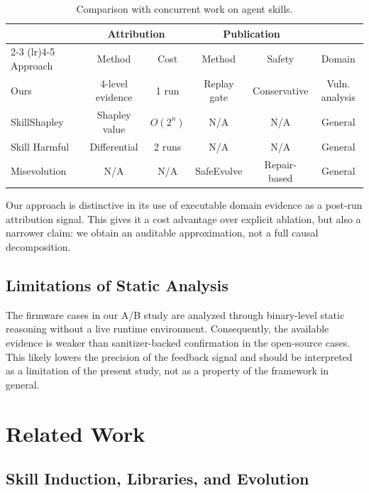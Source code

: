 ﻿\documentclass[preprint,12pt]{elsarticle}
\begin{document}
\begin{table}[t]
\centering
\caption{Comparison with concurrent work on agent skills.}
\label{tab:comparison}
\footnotesize
\begin{tabular}{l c c c c c}
\toprule
& \multicolumn{2}{c}{Attribution} & \multicolumn{2}{c}{Publication} & \\
\cmidrule(lr){2-3} \cmidrule(lr){4-5}
Approach & Method & Cost & Method & Safety & Domain \\
\midrule
Ours & 4-level evidence & 1 run & Replay gate & Conservative & Vuln. analysis \\
SkillShapley~\cite{skillshapley} & Shapley value & $O(2^n)$ & N/A & N/A & General \\
Skill Harmful~\cite{skillharmful} & Differential & 2 runs & N/A & N/A & General \\
Misevolution~\cite{misevolution} & N/A & N/A & SafeEvolve & Repair-based & General \\
\bottomrule
\end{tabular}
\end{table}

Our approach is distinctive in its use of executable domain evidence as a
post-run attribution signal.  This gives it a cost advantage over explicit
ablation, but also a narrower claim: we obtain an auditable approximation,
not a full causal decomposition.

\subsection{Limitations of Static Analysis}

The firmware cases in our A/B study are analyzed through binary-level
static reasoning without a live runtime environment.  Consequently, the
available evidence is weaker than sanitizer-backed confirmation in the
open-source cases.  This likely lowers the precision of the feedback signal
and should be interpreted as a limitation of the present study, not as a
property of the framework in general.

\section{Related Work}
\label{sec:related}

\subsection{Skill Induction, Libraries, and Evolution}
\end{document}
